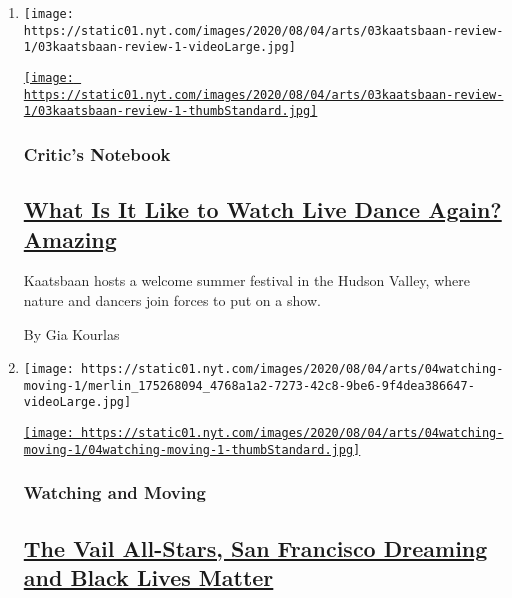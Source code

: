 \begin{enumerate}
\def\labelenumi{\arabic{enumi}.}
\item
  \texttt{[image: https://static01.nyt.com/images/2020/08/04/arts/03kaatsbaan-review-1/03kaatsbaan-review-1-videoLarge.jpg]}

  \href{/2020/08/03/arts/dance/kaatsbaan-dance.html}{\texttt{[image: https://static01.nyt.com/images/2020/08/04/arts/03kaatsbaan-review-1/03kaatsbaan-review-1-thumbStandard.jpg]}}

  \hypertarget{critics-notebook}{%
  \subsubsection{Critic's Notebook}\label{critics-notebook}}

  \hypertarget{what-is-it-like-to-watch-live-dance-again-amazing}{%
  \subsection{\texorpdfstring{\href{/2020/08/03/arts/dance/kaatsbaan-dance.html}{What
  Is It Like to Watch Live Dance Again?
  Amazing}}{What Is It Like to Watch Live Dance Again? Amazing}}\label{what-is-it-like-to-watch-live-dance-again-amazing}}

  Kaatsbaan hosts a welcome summer festival in the Hudson Valley, where
  nature and dancers join forces to put on a show.

  By Gia Kourlas
\item
  \texttt{[image: https://static01.nyt.com/images/2020/08/04/arts/04watching-moving-1/merlin\_175268094\_4768a1a2-7273-42c8-9be6-9f4dea386647-videoLarge.jpg]}

  \href{/2020/08/04/arts/dance/the-best-in-streaming-dance.html}{\texttt{[image: https://static01.nyt.com/images/2020/08/04/arts/04watching-moving-1/04watching-moving-1-thumbStandard.jpg]}}

  \hypertarget{watching-and-moving}{%
  \subsubsection{Watching and Moving}\label{watching-and-moving}}

  \hypertarget{the-vail-all-stars-san-francisco-dreaming-and-black-lives-matter}{%
  \subsection{\texorpdfstring{\href{/2020/08/04/arts/dance/the-best-in-streaming-dance.html}{The
  Vail All-Stars, San Francisco Dreaming and Black Lives
  Matter}}{The Vail All-Stars, San Francisco Dreaming and Black Lives Matter}}\label{the-vail-all-stars-san-francisco-dreaming-and-black-lives-matter}}


\end{enumerate}
